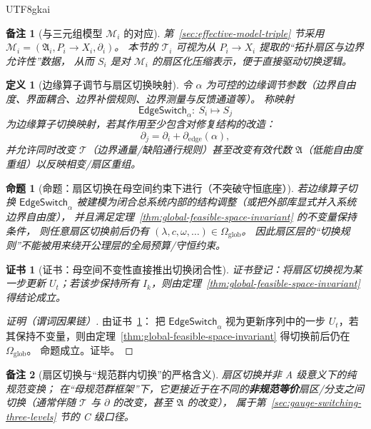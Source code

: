 \documentclass[12pt]{article}
\newtheorem{definition}{定义}[section]
\newtheorem{proposition}{命题}[section]
\newtheorem{remark}{备注}[section]
\newtheorem{Certificate}{证书}[section]
\newcommand{\Bundle}{\ensuremath{P}}
\newcommand{\Conn}{\ensuremath{\omega}}
\begin{document}
\begin{CJK*}{UTF8}{gkai}
\begin{remark}[与三元组模型 $\mathcal{M}_i$ 的对应]
第~\ref{sec:effective-model-triple} 节采用 $\mathcal{M}_i=(\mathfrak{A}_i,\Bundle_i\to X_i,\partial_i)$。
本节的 $\mathcal{T}_i$ 可视为从 $\Bundle_i\to X_i$ 提取的“拓扑扇区与边界允许性”数据，
从而 $S_i$ 是对 $\mathcal{M}_i$ 的扇区化压缩表示，便于直接驱动切换逻辑。
\end{remark}

\begin{definition}[边缘算子调节与扇区切换映射]
令 $\alpha$ 为可控的边缘调节参数（边界自由度、界面耦合、边界补偿规则、边界测量与反馈通道等）。
称映射
\[
  \mathsf{EdgeSwitch}_\alpha:\ S_i\mapsto S_j
\]
为边缘算子切换映射，若其作用至少包含对修复结构的改造：
\[
  \partial_j = \partial_i + \partial_{\mathrm{edge}}(\alpha),
\]
并允许同时改变 $\mathcal{T}$（边界通量/缺陷通行规则）甚至改变有效代数 $\mathfrak{A}$（低能自由度重组）以反映相变/扇区重组。
\end{definition}

\begin{proposition}[命题：扇区切换在母空间约束下进行（不突破守恒底座）]
\label{prop:sector-switching-respects-global-feasible-space}
若边缘算子切换 $\mathsf{EdgeSwitch}_\alpha$ 被建模为闭合总系统内部的结构调整（或把外部库显式并入系统边界自由度），
并且满足定理~\ref{thm:global-feasible-space-invariant} 的不变量保持条件，
则任意扇区切换前后仍有 $(\lambda,c,\Conn,\ldots)\in\Omega_{\mathrm{glob}}$。
因此扇区层的“切换规则”不能被用来绕开公理层的全局预算/守恒约束。
\end{proposition}

\begin{Certificate}[证书：母空间不变性直接推出切换闭合性]
\label{cert:sector-switching-respects-global-feasible-space}
证书登记：将扇区切换视为某一步更新 $U_t$；若该步保持所有 $I_k$，则由定理~\ref{thm:global-feasible-space-invariant} 得结论成立。
\end{Certificate}

\begin{proof}[证明（谓词因果链）]
由证书~\ref{cert:sector-switching-respects-global-feasible-space}：
把 $\mathsf{EdgeSwitch}_\alpha$ 视为更新序列中的一步 $U_t$，若其保持不变量，则由定理~\ref{thm:global-feasible-space-invariant} 得切换前后仍在
  $\Omega_{\mathrm{glob}}$。
命题成立。证毕。
\end{proof}

\begin{remark}[扇区切换与“规范群内切换”的严格含义]
扇区切换并非 A 级意义下的纯规范变换；
在“母规范群框架”下，它更接近于在不同的\textbf{非规范等价}扇区/分支之间切换（通常伴随 $\mathcal{T}$ 与 $\partial$ 的改变，甚至 $\mathfrak{A}$ 的改变），
属于第~\ref{sec:gauge-switching-three-levels} 节的 C 级口径。
\end{remark}


\end{CJK*}
\end{document}
